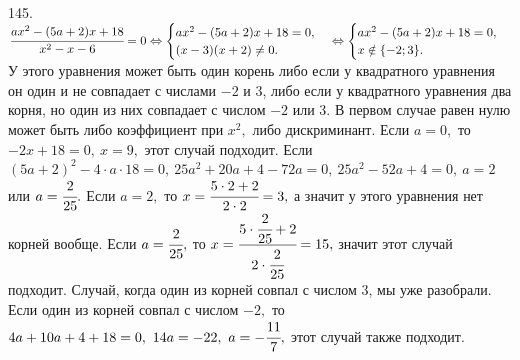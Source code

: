 145. $\cfrac{ax^2-(5a+2)x+18}{x^2-x-6}=0\Leftrightarrow \begin{cases}
ax^2-(5a+2)x+18=0,\\ (x-3)(x+2)\neq0.\end{cases}\Leftrightarrow \begin{cases}
ax^2-(5a+2)x+18=0,\\ x\notin\{-2;3\}.\end{cases}$ У этого уравнения может быть один корень либо если у квадратного уравнения он один и не совпадает с числами $-2$ и 3, либо если у квадратного уравнения два корня, но один из них совпадает с числом $-2$ или 3. В первом случае равен нулю может быть либо коэффициент при $x^2,$ либо дискриминант. Если $a=0,$ то $-2x+18=0,\ x=9,$ этот случай подходит. Если $(5a+2)^2-4\cdot a\cdot18=0,\ 25a^2+20a+4-72a=0,\
25a^2-52a+4=0,\ a=2$ или $a=\cfrac{2}{25}.$ Если $a=2,$ то $x=\cfrac{5\cdot2+2}{2\cdot2}=3,$ а значит у этого уравнения нет корней вообще. Если $a=\cfrac{2}{25},$ то $x=\cfrac{5\cdot\cfrac{2}{25}+2}{2\cdot\cfrac{2}{25}}=15,$ значит этот случай подходит. Случай, когда один из корней совпал с числом 3, мы уже разобрали. Если один из корней совпал с числом $-2,$ то $4a+10a+4+18=0,\ 14a=-22,\ a=-\cfrac{11}{7},$ этот случай также подходит.\\
